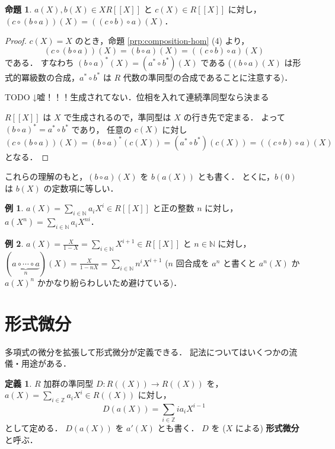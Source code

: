 \documentclass{jsarticle}
\newcommand{\N}{\mathbb{N}}
\newcommand{\Z}{\mathbb{Z}}
\newcommand{\longto}{\longrightarrow}
\theoremstyle{definition}
\newtheorem*{Dfn}{定義}
\newtheorem*{Exm}{例}
\newtheorem{Prp}{命題}
\newenvironment{dfn}{\vspace{1ex}\begin{screen}\begin{Dfn}}{\end{Dfn}\end{screen}\vspace{1ex}}
\newenvironment{exm}{\begin{leftbar}\begin{Exm}}{\end{Exm}\end{leftbar}}
\newenvironment{prp}{\vspace{1ex}\begin{screen}\begin{Prp}}{\end{Prp}\end{screen}}
\newenvironment{prf}{\begin{leftbar}\begin{proof}}{\end{proof}\end{leftbar}}
\begin{document}
\begin{prp}
  $a(X), b(X) \in X R[[X]]$ と $c(X) \in R[[X]]$ に対し，
  $(c \circ (b \circ a))(X) = ((c \circ b) \circ a)(X)$．
\end{prp}
\begin{prf}
  $c(X) = X$ のとき，命題 \ref{prp:composition-hom} (4) より，
  \[
    (c \circ (b \circ a))(X) = (b \circ a)(X) = ((c \circ b) \circ a)(X)
  \]
  である．
  すなわち $(b \circ a)^*(X) = (a^* \circ b^*)(X)$ である ($(b \circ a)(X)$ は形式的冪級数の合成，$a^* \circ b^*$ は $R$ 代数の準同型の合成であることに注意する)．

  TODO ↓嘘！！！生成されてない．位相を入れて連続準同型なら決まる

  $R[[X]]$ は $X$ で生成されるので，準同型は $X$ の行き先で定まる．
  よって $(b \circ a)^* = a^* \circ b^*$ であり，
  任意の $c(X)$ に対し
  \[
    (c \circ (b \circ a))(X) = (b \circ a)^*(c(X)) = (a^* \circ b^*)(c(X)) = ((c \circ b) \circ a)(X)
  \]
  となる．
\end{prf}

これらの理解のもと，$(b \circ a)(X)$ を $b(a(X))$ とも書く．
とくに，$b(0)$ は $b(X)$ の定数項に等しい．

\begin{exm}
  $a(X) = \sum_{i\in\N} a_i X^i \in R[[X]]$ と正の整数 $n$ に対し，
  $a(X^n) = \sum_{i\in\N} a_i X^{ni}$．
\end{exm}

\begin{exm}
  $a(X) = \frac{X}{1 - X} = \sum_{i\in\N} X^{i+1} \in R[[X]]$ と $n \in \N$ に対し，
  $(\underbrace{a \circ \cdots \circ a}_{n})(X) = \frac{X}{1 - n X} = \sum_{i\in\N} n^i X^{i+1}$
  ($n$ 回合成を $a^n$ と書くと $a^n(X)$ か $a(X)^n$ かかなり紛らわしいため避けている)．
\end{exm}


\section{形式微分}
多項式の微分を拡張して形式微分が定義できる．
記法についてはいくつかの流儀・用途がある．

\begin{dfn}
  $R$ 加群の準同型 $D\colon R((X)) \longto R((X))$ を，
  $a(X) = \sum_{i\in\Z} a_i X^i \in R((X))$ に対し，
  \[
    D(a(X)) = \sum_{i\in\Z} i a_i X^{i-1}
  \]
  として定める．
  $D(a(X))$ を $a'(X)$ とも書く．
  $D$ を ($X$ による) \textbf{形式微分}と呼ぶ．
\end{dfn}
\end{document}
